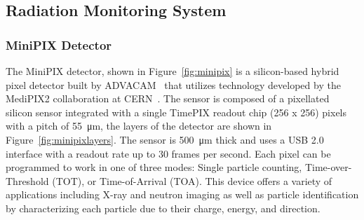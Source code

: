 \subsection{Radiation Monitoring System}
\label{sec:Radiation Design}
\subsubsection{MiniPIX Detector}
The MiniPIX detector, shown in Figure~\ref{fig:minipix} is a silicon-based hybrid pixel detector built by ADVACAM~\cite{advacam} that utilizes technology developed by the MediPIX2 collaboration at CERN~\cite{medipix}. The sensor is composed of a pixellated silicon sensor integrated with a single TimePIX readout chip (256 x 256) pixels with a pitch of \SI{55}{\micro\meter}, the layers of the detector are shown in Figure~\ref{fig:minipixlayers}. The sensor is \SI{500}{\micro\meter} thick and uses a USB 2.0 interface with a readout rate up to 30 frames per second. Each pixel can be programmed to work in one of three modes: Single particle counting, Time-over-Threshold (TOT), or Time-of-Arrival (TOA). This device offers a variety of applications including X-ray and neutron imaging as well as particle identification by characterizing each particle due to their charge, energy, and direction.

